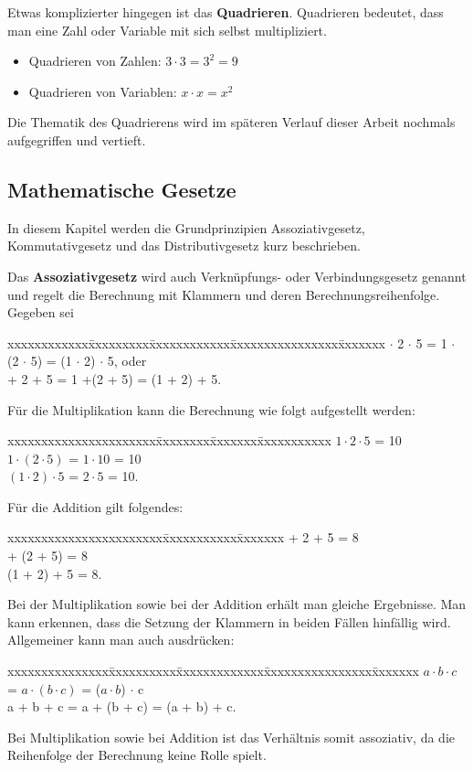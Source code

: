 \documentclass[12pt,a4paper]{article}
\theoremstyle{definition}
\begin{document}
Etwas komplizierter hingegen ist das \textbf{Quadrieren}.
Quadrieren bedeutet, dass man eine Zahl oder Variable mit sich selbst multipliziert.
\begin{itemize}
\item Quadrieren von Zahlen: $3 \cdot 3 = 3^2 = 9$
\item Quadrieren von Variablen: $x \cdot x = x^2$
\end{itemize}
Die Thematik des Quadrierens wird im späteren Verlauf dieser Arbeit nochmals aufgegriffen und vertieft.

\subsection{Mathematische Gesetze}
In diesem Kapitel werden die Grundprinzipien Assoziativgesetz, Kommutativgesetz und das Distributivgesetz kurz beschrieben.

Das \textbf{Assoziativgesetz} wird auch Verknüpfungs- oder Verbindungsgesetz genannt und regelt die Berechnung mit Klammern und deren Berechnungsreihenfolge.
Gegeben sei
\begin{tabbing}
xxxxxxxxxxxx\=xxxxxxxxx\=xxxxxxxxxxxx\=xxxxxxxxxxxxxxxx\=xxxxxxx\kill
{} $\cdot$ 2 $\cdot$ 5 \> = 1 $\cdot$ (2 $\cdot$ 5) \> = (1 $\cdot$ 2) $\cdot$ 5, \> oder \\
 + 2 + 5             \>= 1 +(2 + 5)               \> = (1 + 2) + 5.
\end{tabbing}
Für die Multiplikation kann die Berechnung wie folgt aufgestellt werden:
\begin{tabbing}
xxxxxxxxxxxxxxxxxxxxxx\=xxxxxxxx\=xxxxxxx\=xxxxxxxxxxx\kill
\> $1 \cdot 2 \cdot 5$   \>                \> = 10 \\
\> $1 \cdot (2 \cdot 5)$ \> = $1 \cdot 10$ \> = 10 \\
\> $(1 \cdot 2) \cdot 5$ \> = $2 \cdot 5$  \> = 10.
\end{tabbing}
Für die Addition gilt folgendes:
\begin{tabbing}
xxxxxxxxxxxxxxxxxxxxxxx\=xxxxxxxxxxx\=xxxxxxx\kill
{} + 2 + 5   \> = 8 \\
 + (2 + 5) \> = 8 \\
\> (1 + 2) + 5 \> = 8.
\end{tabbing}
Bei der Multiplikation sowie bei der Addition erhält man gleiche Ergebnisse.
Man kann erkennen, dass die Setzung der Klammern in beiden Fällen hinfällig wird.
Allgemeiner kann man auch ausdrücken:
\begin{tabbing}
xxxxxxxxxxxxxxx\=xxxxxxxxxx\=xxxxxxxxxxxxx\=xxxxxxxxxxxxxxxx\=xxxxxxx\kill
\> $a \cdot b \cdot c$ \> = $a \cdot (b \cdot c)$ \> = ($a \cdot b$) $\cdot$ c \\
\> a + b + c           \> = a + (b + c)           \> = (a + b) + c.
\end{tabbing}
Bei Multiplikation sowie bei Addition ist das Verhältnis somit assoziativ, da die Reihenfolge der Berechnung keine Rolle spielt.
\end{document}
